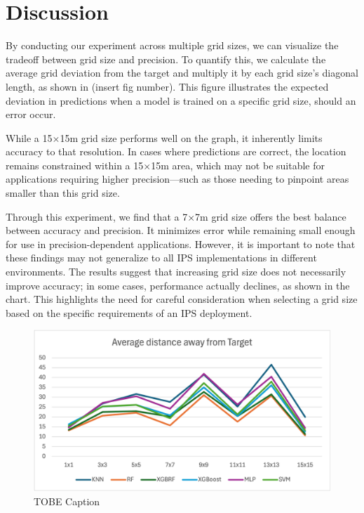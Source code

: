 \documentclass[conference]{IEEEtran}
\begin{document}
	
	\section{Discussion}
	By conducting our experiment across multiple grid sizes, we can visualize the tradeoff between grid size and precision. To quantify this, we calculate the average grid deviation from the target and multiply it by each grid size’s diagonal length, as shown in (insert fig number). This figure illustrates the expected deviation in predictions when a model is trained on a specific grid size, should an error occur.
	
	While a 15×15m grid size performs well on the graph, it inherently limits accuracy to that resolution. In cases where predictions are correct, the location remains constrained within a 15×15m area, which may not be suitable for applications requiring higher precision—such as those needing to pinpoint areas smaller than this grid size.
	
	Through this experiment, we find that a 7×7m grid size offers the best balance between accuracy and precision. It minimizes error while remaining small enough for use in precision-dependent applications. However, it is important to note that these findings may not generalize to all IPS implementations in different environments. The results suggest that increasing grid size does not necessarily improve accuracy; in some cases, performance actually declines, as shown in the chart. This highlights the need for careful consideration when selecting a grid size based on the specific requirements of an IPS deployment.
	
	\begin{figure}[htbp]
		\centerline{\includegraphics[scale=0.65]{image2.png}}
		\caption{TOBE Caption}
		\label{fig3}
	\end{figure}
	
\end{document}
